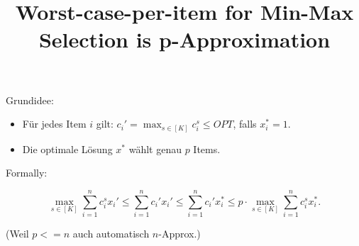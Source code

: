 \documentclass[abstracton]{scrartcl}
\title{Worst-case-per-item for Min-Max Selection is p-Approximation}
\date{}
\begin{document}
	
	\maketitle
	
	Grundidee:
	\begin{itemize}
		\item Für jedes Item \(i\) gilt: \(c_i' = \max_{s \in [K]} c_i^s \le OPT\), falls \(x_i^* = 1\).
		\item Die optimale Lösung \(x^*\) wählt genau \(p\) Items.
	\end{itemize}
	
	Formally:
	
	\[
	\max_{s \in [K]} \sum_{i=1}^{n} c_i^s x_i'
	\le
	\sum_{i=1}^{n} c_i' x_i'
	\le
	\sum_{i=1}^{n} c_i' x_i^*
	\le
	p \cdot \max_{s \in [K]} \sum_{i=1}^{n} c_i^s x_i^* .
	\]
	
	(Weil \(p<=n\) auch automatisch \(n\)-Approx.)
\end{document}
